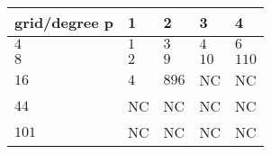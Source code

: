 \begin{tabular}{lllll}
\hline
 grid/degree p   & 1   & 2     & 3    & 4     \\
\hline
 $4$             & $1$ & $3$   & $4$  & $6$   \\
 $8$             & $2$ & $9$   & $10$ & $110$ \\
 $16$            & $4$ & $896$ & NC   & NC    \\
 $44$            & NC  & NC    & NC   & NC    \\
 $101$           & NC  & NC    & NC   & NC    \\
\hline
\end{tabular}
